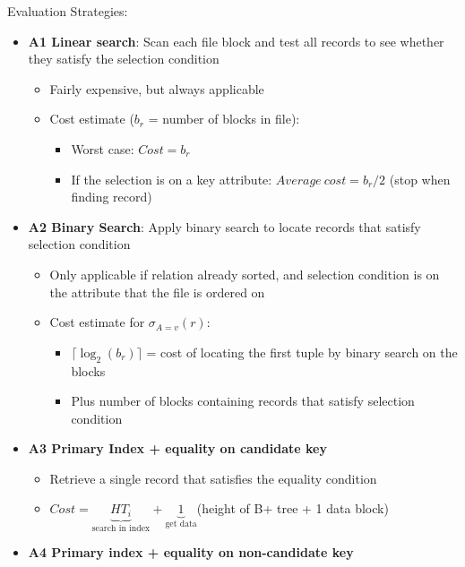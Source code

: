 Evaluation Strategies: 
\begin{itemize}[label=\(\rhd\)]
    \item \textbf{A1 Linear search}: Scan each file block and test all records to see whether they satisfy the selection condition
    \begin{itemize}[label=\(\rhd\)]
        \item Fairly expensive, but always applicable
        \item Cost estimate ($b_r$ = number of blocks in file):
        \begin{itemize}[label=\(\rhd\)]
            \item Worst case: $Cost = b_r$
            \item If the selection is on a key attribute: $Average\ cost = b_r/2$ (stop when finding record)
        \end{itemize}
    \end{itemize}
    \item \textbf{A2 Binary Search}: Apply binary search to locate records that satisfy selection condition
    \begin{itemize}[label=\(\rhd\)]
        \item Only applicable if relation already sorted, and selection condition is on the attribute that the file is ordered on
            \item Cost estimate for $\sigma_{A=v}(r)$: 
        \begin{itemize}[label=\(\rhd\)]
        \item $\lceil \log_2(b_r) \rceil $ = cost of locating the first tuple by binary search on the blocks 
        \item Plus number of blocks containing records that satisfy selection condition
        \end{itemize}
    \end{itemize}
    \item \textbf{A3 Primary Index + equality on candidate key}
    \begin{itemize}[label=\(\rhd\)]
        \item Retrieve a single record that satisfies the equality condition
        \item $Cost = \underbrace{HT_i}_\text{search in index} + \underbrace{1}_\text{get data}$(height of B+ tree + 1 data block)
    \end{itemize}
    \item \textbf{A4 Primary index + equality on non-candidate key}
    \begin{itemize}[label=\(\rhd\)]

\end{itemize}
\end{itemize}
